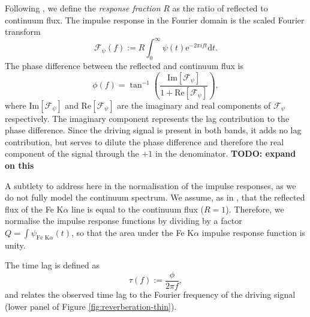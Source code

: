\documentclass[fleqn,usenatbib]{mnras}
\newcommand{\todo}[1]{{\noindent \bf \color{red} TODO: #1}}
\newcommand{\FeKa}{Fe K$\alpha$\xspace}
\newcommand{\e}{\text{e}}
\renewcommand{\d}{\text{d}}
\renewcommand{\Im}[1]{\text{Im}\left[#1\right]}
\renewcommand{\Re}[1]{\text{Re}\left[#1\right]}
\begin{document}
Following \cite{cackett_modelling_2014}, we define the \textit{response
fraction} $R$ as the ratio of reflected to continuum flux. The impulse response
in the Fourier domain is the scaled Fourier transform
\begin{equation}
	\mathscr{F}_\psi(f) := R \int_{0}^\infty \psi(t) \e^{-2\pi i f t} \d t.
\end{equation}
The phase difference between the reflected and continuum flux is
\begin{equation}
	\phi(f) = \tan^{-1} \left(
		\frac{\Im{\mathscr{F}_\psi}}{1 + \Re{\mathscr{F}_\psi}}
	\right),
\end{equation}
where $\Im{\mathscr{F}_\psi}$ and $\Re{\mathscr{F}_\psi}$ are the imaginary and
real components of $\mathscr{F}_\psi$ respectively. The imaginary component
represents the lag contribution to the phase difference. Since the driving
signal is present in both bands, it adds no lag contribution, but serves to
dilute the phase difference and therefore the real component of the signal
through the $+1$ in the denominator. \todo{expand on this}

A subtlety to address here in the normalisation of the impulse responses, as we
do not fully model the continuum spectrum. We assume, as in
\cite{cackett_modelling_2014}, that the reflected flux of the Fe
K$\alpha$ line is equal to the continuum flux ($R = 1$). Therefore, we normalise
the impulse response functions by dividing by a factor $Q = \int \psi_{\text{Fe
K}\alpha}(t)$, so that the area under the \FeKa impulse response function
is unity.


The time lag is defined as
\begin{equation}
	\tau(f) := \frac{\phi}{2 \pi f},
\end{equation}
and relates the observed time lag to the Fourier frequency of the driving signal (lower panel of Figure \ref{fig:reverberation-thin}).
\end{document}
